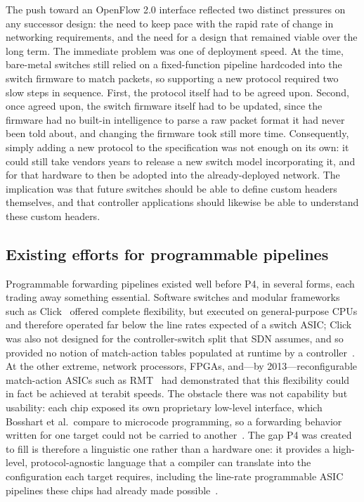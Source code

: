 The push toward an OpenFlow 2.0 interface reflected two distinct pressures on any successor design: the need to keep pace with the rapid rate of change in networking requirements, and the need for a design that remained viable over the long term. The immediate problem was one of deployment speed. At the time, bare-metal switches still relied on a fixed-function pipeline hardcoded into the switch firmware to match packets, so supporting a new protocol required two slow steps in sequence. First, the protocol itself had to be agreed upon. Second, once agreed upon, the switch firmware itself had to be updated, since the firmware had no built-in intelligence to parse a raw packet format it had never been told about, and changing the firmware took still more time. Consequently, simply adding a new protocol to the specification was not enough on its own: it could still take vendors years to release a new switch model incorporating it, and for that hardware to then be adopted into the already-deployed network. The implication was that future switches should be able to define custom headers themselves, and that controller applications should likewise be able to understand these custom headers.

\subsection{Existing efforts for programmable pipelines}
Programmable forwarding pipelines existed well before P4, in several forms, each trading away something essential. Software switches and modular frameworks such as Click~\cite{kohler2000click} offered complete flexibility, but executed on general-purpose CPUs and therefore operated far below the line rates expected of a switch ASIC; Click was also not designed for the controller-switch split that SDN assumes, and so provided no notion of match-action tables populated at runtime by a controller~\cite{bosshart2014p4}. At the other extreme, network processors, FPGAs, and---by 2013---reconfigurable match-action ASICs such as RMT~\cite{bosshart2013rmt} had demonstrated that this flexibility could in fact be achieved at terabit speeds. The obstacle there was not capability but usability: each chip exposed its own proprietary low-level interface, which Bosshart et al.\ compare to microcode programming, so a forwarding behavior written for one target could not be carried to another~\cite{bosshart2014p4}. The gap P4 was created to fill is therefore a linguistic one rather than a hardware one: it provides a high-level, protocol-agnostic language that a compiler can translate into the configuration each target requires, including the line-rate programmable ASIC pipelines these chips had already made possible~\cite{bosshart2014p4}.

